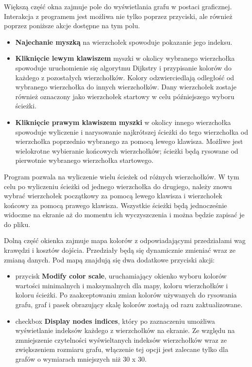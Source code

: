 \documentclass[]{article}
\begin{document}
Większą część okna zajmuje pole do wyświetlania grafu w postaci graficznej. 
Interakcja z programem jest możliwa nie tylko poprzez przyciski, ale również poprzez poniższe akcje dostępne na tym polu.
\begin{itemize}

\item
\textbf{Najechanie myszką} na wierzchołek spowoduje pokazanie jego indeksu.
\item
\textbf{Kliknięcie lewym klawiszem} myszki w okolicy wybranego wierzchołka spowoduje uruchomienie się algorytmu Dijkstry i przypisanie kolorów do każdego z pozostałych wierzchołków. Kolory odzwierciedlają odległość od wybranego wierzchołka do innych wierzchołków. Dany wierzchołek zostaje również oznaczony jako wierzchołek startowy w celu późniejszego wyboru ścieżki.
\item
\textbf{Kliknięcie prawym klawiszem myszki} w okolicy innego wierzchołka spowoduje wyliczenie i narysowanie najkrótszej ścieżki do tego wierzchołka od wierzchołka poprzednio wybranego za pomocą lewego klawisza. Możliwe jest wielokrotne wybieranie końcowych wierzchołków; ścieżki będą rysowane od pierwotnie wybranego wierzchołka startowego.

\end{itemize}

Program pozwala na wyliczenie wielu ścieżek od różnych wierzchołków. W tym celu po wyliczeniu ścieżki od jednego wierzchołka do drugiego, należy znowu wybrać wierzchołek początkowy za pomocą lewego klawisza i wierzchołek końcowy za pomocą prawego klawisza. Wszystkie ścieżki będą jednocześnie widoczne na ekranie aż do momentu ich wyczyszczenia i można będzie zapisać je do pliku.

Dolną część okienka zajmuje mapa kolorów z odpowiadającymi przedziałami wag krawędzi i kosztów dojścia. Przedziały będą się dynamicznie zmieniać wraz ze zmianą danych.
Pod mapą znajdują się dwa dodatkowe przyciski akcji: 
\begin{itemize}
    \item 
przycisk \textbf {Modify color scale}, uruchamiający okienko wyboru kolorów wartości minimalnych i maksymalnych dla mapy, koloru wierzchołków i koloru ścieżki. Po zaakceptowaniu zmian kolorów używanych do rysowania grafu, graf i pasek obrazujący skalę kolorów zostają od razu zaktualizowane.
\item
checkbox \textbf{Display nodes indices}, który po zaznaczeniu umożliwa wyświetlanie indeksów każdego z wierzchołków na ekranie. Ze względu na zmniejszenie czytelności wyświeltanych indeksów wierzchołków wraz ze zwiększeniem rozmiaru grafu, włączenie tej opcji jest zalecane tylko dla grafów o wymiarach mniejszych niż 30 x 30. 
\end{itemize}
\end{document}
